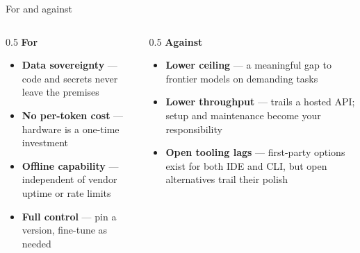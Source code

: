 \documentclass[aspectratio=169,10pt]{beamer}
\begin{document}
\begin{frame}{For and against}
  \begin{columns}[T]
    \begin{column}{0.5\textwidth}
      \centering\textbf{\textcolor{good}{For}}\par\vspace{0.4em}
      \begin{itemize}
        \small
        \item \textbf{Data sovereignty} --- code and secrets never leave the
          premises
        \item \textbf{No per-token cost} --- hardware is a one-time
          investment
        \item \textbf{Offline capability} --- independent of vendor uptime
          or rate limits
        \item \textbf{Full control} --- pin a version, fine-tune as needed
      \end{itemize}
    \end{column}
    \begin{column}{0.5\textwidth}
      \centering\textbf{\textcolor{bad}{Against}}\par\vspace{0.4em}
      \begin{itemize}
        \small
        \item \textbf{Lower ceiling} --- a meaningful gap to frontier models
          on demanding tasks
        \item \textbf{Lower throughput} --- trails a hosted API; setup and
          maintenance become your responsibility
        \item \textbf{Open tooling lags} --- first-party options exist for
          both IDE and CLI, but open alternatives trail their polish
      \end{itemize}
    \end{column}
  \end{columns}
\end{frame}
\end{document}
